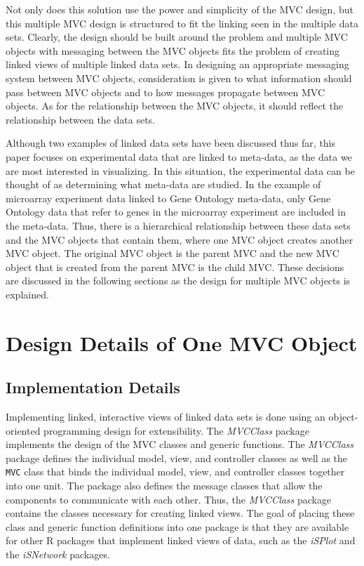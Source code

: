 \documentclass{article}[11pt]
\newcommand{\Robject}[1]{{\texttt{#1}}}
\newcommand{\Rpackage}[1]{{\textit{#1}}}
\begin{document}
Not only does this solution use the power and simplicity of the MVC design, but
this multiple MVC design is structured to fit the linking seen in the multiple
data sets.  Clearly, the design should be built around the problem and
multiple MVC objects with messaging between the MVC objects fits the problem
of creating linked views of multiple linked data sets.  In designing an
appropriate messaging system between MVC objects, consideration is given to
what information should pass between MVC objects and to how messages propagate
between MVC objects.  As for the relationship between the MVC objects, it
should reflect the relationship between the data sets.  

Although two examples of linked data sets have been discussed thus far,
this paper focuses on experimental data that are linked to meta-data, as
the data we are most interested in visualizing.  In this situation, the
experimental data can be thought of as determining what meta-data are studied.
In the example of microarray experiment data linked to Gene Ontology
meta-data, only Gene Ontology data that refer to genes in the microarray
experiment are included in the meta-data.  Thus, there is a hierarchical
relationship between these data sets and the MVC objects that contain them,
where one MVC object creates another MVC object.  The original MVC
object is the parent MVC and the new MVC object that is created from the
parent MVC is the child MVC.  These decisions are discussed in the following
sections as the design for multiple MVC objects is explained. 

\section{Design Details of One MVC Object}\label{Sec:OneMVC}

\subsection{Implementation Details}\label{SSec:OneOver}

Implementing linked, interactive views of linked data sets is done using an
object-oriented programming design for extensibility.  The \Rpackage{MVCClass}
package implements the design of the MVC classes and generic functions.  The
\Rpackage{MVCClass} package defines the individual model, view, and
controller classes as well as the \Robject{MVC} class that binds the
individual model, view, and controller classes together into one unit.  The
package also defines the message classes that allow the components to
communicate with each other.  Thus, the \Rpackage{MVCClass} package
contains the classes necessary for creating linked views.   The goal of
placing these class and generic function definitions into one package is
that they are available for other R packages that implement linked views
of data, such as the \Rpackage{iSPlot} and the \Rpackage{iSNetwork} packages.  
\end{document}
